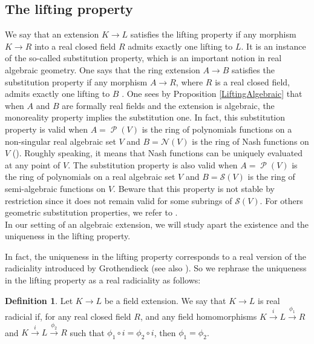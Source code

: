 \documentclass[12pt]{amsart}
\theoremstyle{definition}
\newtheorem{defn}[thm]{Definition}
\DeclareMathOperator{\Pol}{\mathcal P}
\def \S {{\mathcal S}}
\def \S {{\mathcal S}}
\def \Na {{\mathcal N}}
\begin{document}
\subsection{The lifting property}

We say that an extension $K\to L$ satisfies the lifting property if any morphism $K\to R$ into a real closed field $R$ admits exactly one lifting to $L$. 
It is an instance of the so-called substitution property, which is an important notion in real algebraic geometry. One says that the ring extension $A\to B$ satisfies the substitution property if any morphism $A\to R$, where $R$ is a real closed field, admits exactly one lifting to $B$ \cite{FMQ-subs}.
One sees by Proposition \ref{LiftingAlgebraic} that when $A$ and $B$ are formally real fields and the extension is algebraic, the  monoreality property implies the substitution one.
In fact, this substitution property is valid when $A=\Pol(V)$ is the ring of polynomials functions on a non-singular real algebraic set $V$ and $B=\Na (V)$ is the ring of Nash functions on $V$ (\cite[Th 8.5.2]{BCR}). 
Roughly speaking, it means that Nash functions can be uniquely evaluated at any point of $V$.
The substitution property is also valid when $A=\Pol(V)$ is the ring of polynomials on a real algebraic set $V$ and $B=\S(V)$ is the ring of semi-algebraic functions on $V$. Beware that this property is not stable by restriction since it does not remain valid for some subrings of $\S(V)$. For others geometric substitution properties, we refer to \cite{FMQ-subs}.\\




















In our setting of an algebraic extension, we will study apart the existence and the uniqueness in the lifting property.

In fact, the uniqueness in the lifting property corresponds to a real version of the radiciality introduced by Grothendieck \cite{Gr1} (see also \cite{BFMQ}). So we rephrase the uniqueness in the lifting property as a real radiciality as follows:


\begin{defn}
Let $K\to L$ be a field extension. We say that $K\to L$ is real radicial if, for any real closed field $R$, and any field homomorphisms $K\stackrel{i}{\to} L\stackrel{\phi_1}{\to}R$
and $K\stackrel{i}{\to} L\stackrel{\phi_2}{\to}R$
such that $\phi_1\circ i=\phi_2\circ i$, then $\phi_1=\phi_2$.	
\end{defn} 
\end{document}
